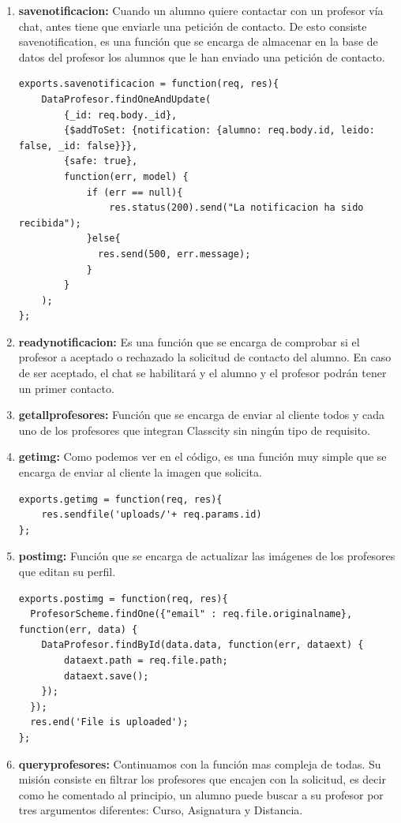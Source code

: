 \begin{itemize}
\begin{enumerate}
    \item \textbf {savenotificacion: } Cuando un alumno quiere contactar con un profesor vía chat, antes tiene que enviarle una petición de contacto. De esto consiste savenotification, es una función que se encarga de almacenar en la base de datos del profesor los alumnos que le han enviado una petición de contacto.
\begin{lstlisting}
exports.savenotificacion = function(req, res){
    DataProfesor.findOneAndUpdate(
        {_id: req.body._id},
        {$addToSet: {notification: {alumno: req.body.id, leido: false, _id: false}}},
        {safe: true},
        function(err, model) {
            if (err == null){
                res.status(200).send("La notificacion ha sido recibida");
            }else{
              res.send(500, err.message);
            }
        }
    );
};

\end{lstlisting}  
    
    \item \textbf {readynotificacion: }Es una función que se encarga de comprobar si el profesor a aceptado o rechazado la solicitud de contacto del alumno. En caso de ser aceptado, el chat se habilitará y el alumno y el profesor podrán tener un primer contacto.
    
    \item \textbf {getallprofesores: } Función que se encarga de enviar al cliente todos y cada uno de los profesores que integran Classcity sin ningún tipo de requisito. 
    \item \textbf {getimg: } Como podemos ver en el código, es una función muy simple que se encarga de enviar al cliente la imagen que solicita.
    \begin{lstlisting}
exports.getimg = function(req, res){
    res.sendfile('uploads/'+ req.params.id)
};
    \end{lstlisting}
    \item \textbf {postimg: } Función que se encarga de actualizar las imágenes de los profesores que editan su perfil. 
\begin{lstlisting}
exports.postimg = function(req, res){
  ProfesorScheme.findOne({"email" : req.file.originalname}, function(err, data) {
    DataProfesor.findById(data.data, function(err, dataext) {
        dataext.path = req.file.path;
        dataext.save();
    });
  });
  res.end('File is uploaded');
};
\end{lstlisting}
    
    \item \textbf {queryprofesores: } Continuamos con la función mas compleja de todas. Su misión consiste en filtrar los profesores que encajen con la solicitud, es decir como he comentado al principio, un alumno puede buscar a su profesor por tres argumentos diferentes: Curso, Asignatura y Distancia. 
    

\end{enumerate}
\end{itemize}

